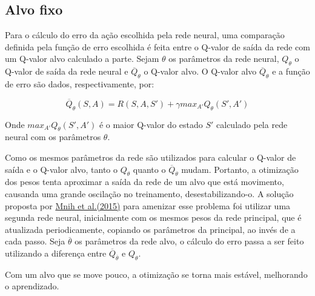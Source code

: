 
\subsection{Alvo fixo}
\label{sec:ft}

Para o cálculo do erro da ação escolhida pela rede neural, uma comparação definida pela função de erro escolhida é feita entre o Q-valor de saída da rede com um Q-valor alvo calculado a parte.
Sejam $\theta$ os parâmetros da rede neural, $Q_{\theta}$ o Q-valor de saída da rede neural e $\overline{Q}_{\theta}$ o Q-valor alvo.
O Q-valor alvo $\overline{Q}_{\theta}$ e a função de erro são dados, respectivamente, por:

\begin{equation} \label{eq:q_target}
\overline{Q}_{\theta}(S,A) = R(S,A,S') + \gamma max_{A'}Q_{\theta}(S',A')
\end{equation}

Onde $max_{A'}Q_{\theta}(S',A')$ é o maior Q-valor do estado $S'$ calculado pela rede neural com os parâmetros $\theta$.

Como os mesmos parâmetros da rede são utilizados para calcular o Q-valor de saída e o Q-valor alvo, tanto o $Q_{\theta}$ quanto o $\overline{Q}_{\theta}$ mudam.
Portanto, a otimização dos pesos tenta aproximar a saída da rede de um alvo que está movimento, causanda uma grande oscilação no treinamento, desestabilizando-o.
A solução proposta por \hyperlink{Mni+15}{Mnih et al.(2015)} para amenizar esse problema foi utilizar uma segunda rede neural, inicialmente com os mesmos pesos da rede principal, que é atualizada periodicamente, copiando os parâmetros da principal, ao invés de a cada passo.
Seja $\overline{\theta}$ os parâmetros da rede alvo, o cálculo do erro passa a ser feito utilizando a diferença entre $\overline{Q}_{\overline{\theta}}$ e $Q_{\theta}$.

Com um alvo que se move pouco, a otimização se torna mais estável, melhorando o aprendizado.
